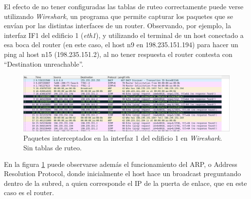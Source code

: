 El efecto de no tener configuradas las tablas de ruteo correctamente puede verse utilizando \textit{Wireshark}, un programa que permite capturar los paquetes que se envían por las distintas interfaces de un router. Observando, por ejemplo, la interfaz IF1 del edificio 1 (\textit{eth1}), y utilizando el terminal de un host conectado a esa boca del router (en este caso, el host n9 en 198.235.151.194) para hacer un ping al host n15 (198.235.151.2), al no tener respuesta el router contesta con \enquote{Destination unreachable}.

\begin{figure}[H]
    \centering
    \includegraphics[scale=0.5]{Imagenes/Wireshark - Sin ruteo.png}
    \caption{Paquetes interceptados en la interfaz 1 del edificio 1 en \textit{Wireshark}. Sin tablas de ruteo.}
    \label{diagrama2}
\end{figure}

En la figura \ref{diagrama2} puede observarse además el funcionamiento del ARP, o Address Resolution Protocol, donde inicialmente el host hace un broadcast preguntando dentro de la subred, a quien corresponde el IP de la puerta de enlace, que en este caso es el router.